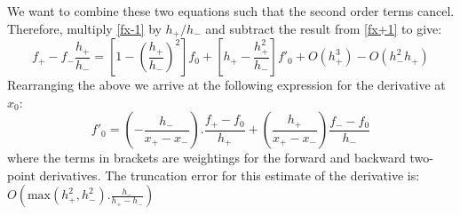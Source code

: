 We want to combine these two equations such that the second order terms cancel. Therefore, multiply \cref{fx-1} by $h_+/h_-$ and subtract the result from \cref{fx+1} to give:
\begin{equation*}
f_+ - f_-\frac{h_+}{h_-} = \left[1 - \left(\frac{h_+}{h_-}\right)^2\right]f_0 + \left[h_+ - \frac{h_+^2}{h_-}\right]f'_0 + O(h_+^3) - O(h_-^2 h_+)
\end{equation*}
Rearranging the above we arrive at the following expression for the derivative at $x_0$:
\begin{equation}
f'_0 = \left(-\frac{h_-}{x_+-x_-}\right).\frac{f_+ - f_0}{h_+} + \left(\frac{h_+}{x_+-x_-}\right) \frac{f_- - f_0}{h_-} 
\end{equation}
where the terms in brackets are weightings for the forward and backward two-point derivatives. The truncation error for this estimate of the derivative is:
$O\left(\text{max}(h_+^2,h_-^2). \frac{h_-}{h_+-h_-}\right)$

